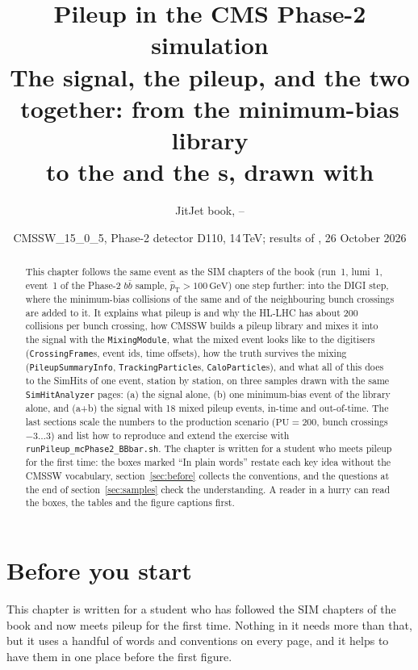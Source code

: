 \documentclass[11pt,a4paper]{article}
\title{\textbf{Pileup in the CMS Phase-2 simulation}\\[4pt]
  \large The signal, the pileup, and the two together: from the minimum-bias library\\
  to the \code{MixingModule} and the \code{CrossingFrame}s, drawn with \code{SimHitAnalyzer}}
\author{JitJet book, \code{JitJetSW/Journey} -- \code{doc/pu/PUSIM.tex}}
\date{CMSSW\_15\_0\_5, Phase-2 detector D110, 14\,TeV; results of \code{test/PU\_Phase2/}, 26 October 2026}
\newcommand{\code}[1]{\texttt{#1}}
\newcommand{\bbbar}{\ensuremath{b\bar{b}}}
\newcommand{\GeV}{\,\mathrm{GeV}}
\newcommand{\ptHat}{\ensuremath{\hat{p}_{\mathrm{T}}}}
\begin{document}
\maketitle

\begin{abstract}
\noindent
This chapter follows the same event as the SIM chapters of the book (run~1, lumi~1, event~1 of the Phase-2
\bbbar{} sample, $\ptHat > 100\GeV$) one step further: into the DIGI step, where the minimum-bias collisions of
the same and of the neighbouring bunch crossings are added to it. It explains what pileup is and why the HL-LHC
has about 200 collisions per bunch crossing, how CMSSW builds a pileup library and mixes it into the signal
with the \code{MixingModule}, what the mixed event looks like to the digitisers (\code{CrossingFrame}s, event
ids, time offsets), how the truth survives the mixing (\code{PileupSummaryInfo}, \code{TrackingParticle}s,
\code{CaloParticle}s), and what all of this does to the SimHits of one event, station by station, on three
samples drawn with the same \code{SimHitAnalyzer} pages: (a) the signal alone, (b) one minimum-bias event
of the library alone, and (a+b) the signal with 18 mixed pileup events, in-time and out-of-time. The last
sections scale the numbers to the production scenario ($\mathrm{PU}=200$, bunch crossings $-3\ldots3$) and
list how to reproduce and extend the exercise with \code{runPileup\_mcPhase2\_BBbar.sh}.
The chapter is written for a student who meets pileup for the first time: the boxes marked ``In plain
words'' restate each key idea without the CMSSW vocabulary, section~\ref{sec:before} collects the
conventions, and the questions at the end of section~\ref{sec:samples} check the understanding. A reader in a
hurry can read the boxes, the tables and the figure captions first.
\end{abstract}
\clearpage
\tableofcontents
\clearpage

\section{Before you start}
\label{sec:before}

This chapter is written for a student who has followed the SIM chapters of the book and now meets pileup for
the first time. Nothing in it needs more than that, but it uses a handful of words and conventions on every
page, and it helps to have them in one place before the first figure.
\end{document}
